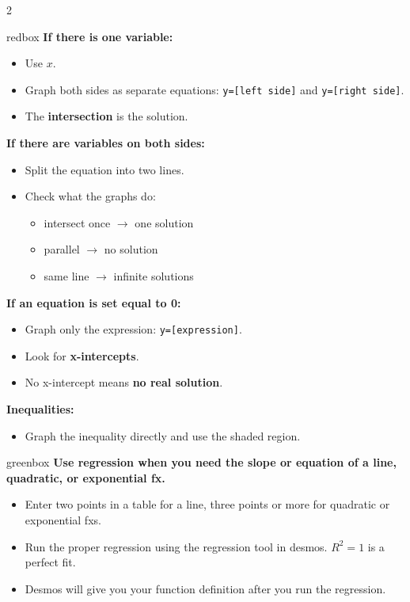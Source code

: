 \documentclass[11pt]{article}
\newcommand{\code}[1]{\texttt{#1}}
\begin{document}
\begin{multicols}{2}
\columnbreak

\begin{skillbox}{redbox}
\textbf{If there is one variable:}
\begin{itemize}
  \item Use \textbf{$x$}.
  \item Graph both sides as separate equations: \code{y=[left side]} and \code{y=[right side]}.
  \item The \textbf{intersection} is the solution.
\end{itemize}

\textbf{If there are variables on both sides:}
\begin{itemize}
  \item Split the equation into two lines.
  \item Check what the graphs do:
  \begin{itemize}
    \item intersect once $\rightarrow$ one solution
    \item parallel $\rightarrow$ no solution
    \item same line $\rightarrow$ infinite solutions
  \end{itemize}
\end{itemize}

\textbf{If an equation is set equal to 0:}
\begin{itemize}
  \item Graph only the expression: \code{y=[expression]}.
  \item Look for \textbf{x-intercepts}.
  \item No x-intercept means \textbf{no real solution}.
\end{itemize}

\textbf{Inequalities:}
\begin{itemize}
  \item Graph the inequality directly and use the shaded region.
\end{itemize}
\end{skillbox}

\vspace{0.4em}

\begin{skillbox}[3. Regressions]{greenbox}
\textbf{Use regression when you need the slope or equation of a line, quadratic, or exponential fx.}
\begin{itemize}
  \item Enter two points in a table for a line, three points or more for quadratic or exponential fxs.
  \item Run the proper regression using the regression tool in desmos.  $R^2 = 1$ is a perfect fit.
  \item Desmos will give you your function definition after you run the regression.
\end{itemize}


\end{skillbox}
\end{multicols}
\end{document}
